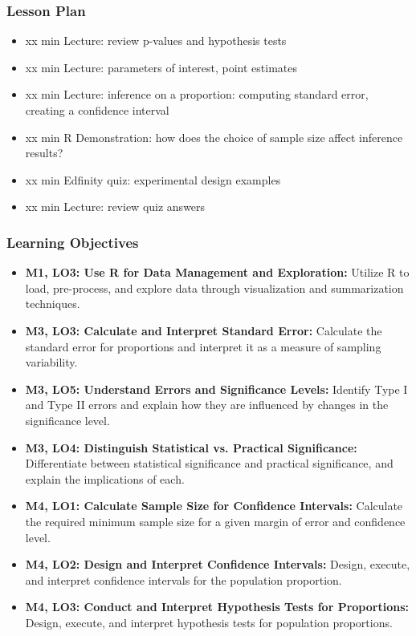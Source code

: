 \begin{frame}
    \frametitle{Lesson Plan}
    \begin{itemize}
        \item xx min Lecture: review p-values and hypothesis tests
        \item xx min Lecture: parameters of interest, point estimates
        \item xx min Lecture: inference on a proportion: computing standard error, creating a confidence interval
        \item xx min R Demonstration: how does the choice of sample size affect inference results?
        \item xx min Edfinity quiz: experimental design examples
        \item xx min Lecture: review quiz answers
    \end{itemize}
\end{frame}
            
\begin{frame}
    \frametitle{Learning Objectives}
    \begin{itemize}
        \item \textbf{M1, LO3: Use R for Data Management and Exploration:} Utilize R to load, pre-process, and explore data through visualization and summarization techniques.
        \item \textbf{M3, LO3: Calculate and Interpret Standard Error:} Calculate the standard error for proportions and interpret it as a measure of sampling variability.
        \item \textbf{M3, LO5: Understand Errors and Significance Levels:} Identify Type I and Type II errors and explain how they are influenced by changes in the significance level.
        \item \textbf{M3, LO4: Distinguish Statistical vs. Practical Significance:} Differentiate between statistical significance and practical significance, and explain the implications of each.
        \item \textbf{M4, LO1: Calculate Sample Size for Confidence Intervals:} Calculate the required minimum sample size for a given margin of error and confidence level.
        \item \textbf{M4, LO2: Design and Interpret Confidence Intervals:} Design, execute, and interpret confidence intervals for the population proportion.
        \item \textbf{M4, LO3: Conduct and Interpret Hypothesis Tests for Proportions:} Design, execute, and interpret hypothesis tests for population proportions.
    \end{itemize}
\end{frame}
    
